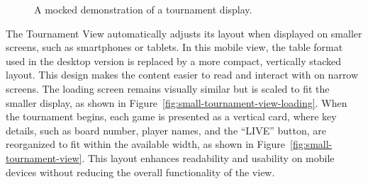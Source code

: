 \begin{figure}[h!] \centering {}\caption[Display of tournament]{A mocked demonstration of a tournament display.}\label{fig:tournament-view-mocked} \end{figure}

The Tournament View automatically adjusts its layout when displayed on smaller screens, such as smartphones or tablets. In this mobile view, the table format used in the desktop version is replaced by a more compact, vertically stacked layout. This design makes the content easier to read and interact with on narrow screens. The loading screen remains visually similar but is scaled to fit the smaller display, as shown in Figure~\ref{fig:small-tournament-view-loading}. When the tournament begins, each game is presented as a vertical card, where key details, such as board number, player names, and the “LIVE” button, are reorganized to fit within the available width, as shown in Figure~\ref{fig:small-tournament-view}. This layout enhances readability and usability on mobile devices without reducing the overall functionality of the view. \\

